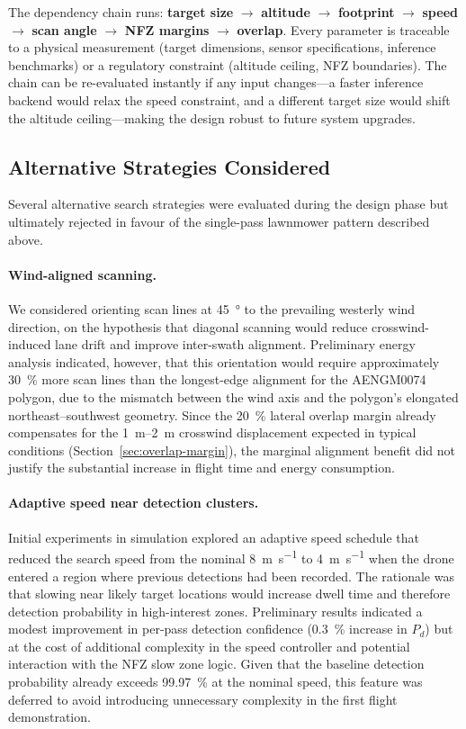 \noindent The dependency chain runs: \textbf{target size} $\to$ \textbf{altitude} $\to$ \textbf{footprint} $\to$ \textbf{speed} $\to$ \textbf{scan angle} $\to$ \textbf{NFZ margins} $\to$ \textbf{overlap}.
Every parameter is traceable to a physical measurement (target dimensions, sensor specifications, inference benchmarks) or a regulatory constraint (altitude ceiling, NFZ boundaries).
The chain can be re-evaluated instantly if any input changes---a faster inference backend would relax the speed constraint, and a different target size would shift the altitude ceiling---making the design robust to future system upgrades.

\subsection{Alternative Strategies Considered}\label{sec:opt-alternatives}

Several alternative search strategies were evaluated during the design phase but ultimately rejected in favour of the single-pass lawnmower pattern described above.

\paragraph{Wind-aligned scanning.}
We considered orienting scan lines at \SI{45}{\degree} to the prevailing westerly wind direction, on the hypothesis that diagonal scanning would reduce crosswind-induced lane drift and improve inter-swath alignment.  Preliminary energy analysis indicated, however, that this orientation would require approximately \SI{30}{\percent} more scan lines than the longest-edge alignment for the AENGM0074 polygon, due to the mismatch between the wind axis and the polygon's elongated northeast--southwest geometry.  Since the \SI{20}{\percent} lateral overlap margin already compensates for the \SIrange{1}{2}{\metre} crosswind displacement expected in typical conditions (Section~\ref{sec:overlap-margin}), the marginal alignment benefit did not justify the substantial increase in flight time and energy consumption.

\paragraph{Adaptive speed near detection clusters.}
Initial experiments in simulation explored an adaptive speed schedule that reduced the search speed from the nominal \SI{8}{\metre\per\second} to \SI{4}{\metre\per\second} when the drone entered a region where previous detections had been recorded.  The rationale was that slowing near likely target locations would increase dwell time and therefore detection probability in high-interest zones.  Preliminary results indicated a modest improvement in per-pass detection confidence (\SI{0.3}{\percent} increase in $P_d$) but at the cost of additional complexity in the speed controller and potential interaction with the NFZ slow zone logic.  Given that the baseline detection probability already exceeds \SI{99.97}{\percent} at the nominal speed, this feature was deferred to avoid introducing unnecessary complexity in the first flight demonstration.

